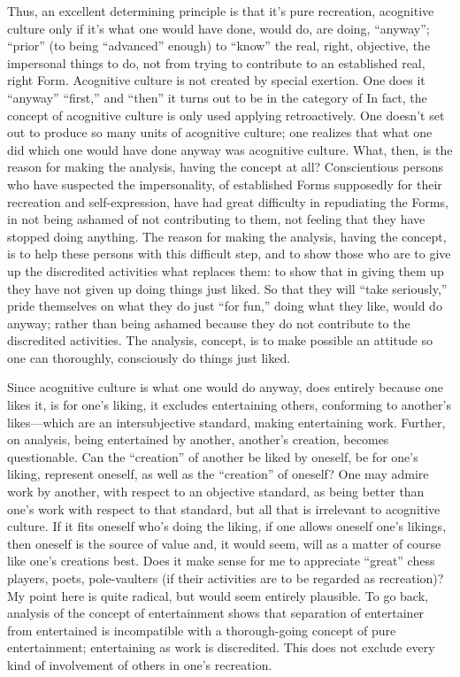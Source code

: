Thus, an excellent determining principle is that it's pure recreation, acognitive culture only if it's what one would have done, would do, are doing, \enquote{anyway}; \enquote{prior} (to being \enquote{advanced} enough) to \enquote{know} the real, right, objective, the impersonal things to do, not from trying to contribute to an established real, right Form. Acognitive culture is not created by special exertion. One does it \enquote{anyway} \enquote{first,} and \enquote{then} it turns out to be in the category of  In fact, the concept of acognitive culture is only used applying retroactively. One doesn't set out to produce so many units of acognitive culture; one realizes that what one did which one would have done anyway was acognitive culture. What, then, is the reason for making the analysis, having the concept at all? Conscientious persons who have suspected the impersonality, of established Forms supposedly for their recreation and self-expression, have had great difficulty in repudiating the Forms, in not being ashamed of not contributing to them, not feeling that they have stopped doing anything. The reason for making the analysis, having the concept, is to help these persons with this difficult step, and to show those who are to give up the discredited activities what replaces them: to show that in giving them up they have not given up doing things just liked. So that they will \enquote{take seriously,} pride themselves on what they do just \enquote{for fun,} doing what they like, would do anyway; rather than being ashamed because they do not contribute to the discredited activities. The analysis, concept, is to make possible an attitude so one can thoroughly, consciously do things just liked.

Since acognitive culture is what one would do anyway, does entirely because one likes it, is for one's liking, it excludes entertaining others, conforming to another's likes---which are an intersubjective standard, making entertaining work. Further, on analysis, being entertained by another, another's creation, becomes questionable. Can the \enquote{creation} of another be liked by oneself, be for one's liking, represent oneself, as well as the \enquote{creation} of oneself? One may admire work by another, with respect to an objective standard, as being better than one's work with respect to that standard, but all that is irrelevant to acognitive culture. If it fits oneself who's doing the liking, if one allows oneself one's likings, then oneself is the source of value and, it would seem, will as a matter of course like one's creations best. Does it make sense for me to appreciate \enquote{great} chess players, poets, pole-vaulters (if their activities are to be regarded as recreation)? My point here is quite radical, but would seem entirely plausible. To go back, analysis of the concept of entertainment shows that separation of entertainer from entertained is incompatible with a thorough-going concept of pure entertainment; entertaining as work is discredited. This does not exclude every kind of involvement of others in one's recreation.

